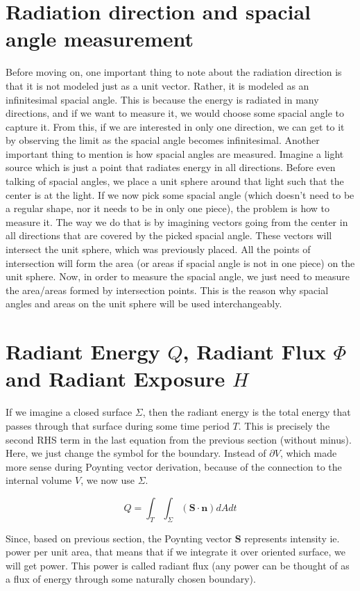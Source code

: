 \documentclass{article}
\begin{document}
\section{Radiation direction and spacial angle measurement}

Before moving on, one important thing to note about the radiation direction is that it is not modeled just as a unit vector. Rather, it is modeled as an infinitesimal spacial angle. This is because the energy is radiated in many directions, and if we want to measure it, we would choose some spacial angle to capture it. From this, if we are interested in only one direction, we can get to it by observing the limit as the spacial angle becomes infinitesimal. Another important thing to mention is how spacial angles are measured. Imagine a light source which is just a point that radiates energy in all directions. Before even talking of spacial angles, we place a unit sphere around that light such that the center is at the light. If we now pick some spacial angle (which doesn't need to be a regular shape, nor it needs to be in only one piece), the problem is how to measure it. The way we do that is by imagining vectors going from the center in all directions that are covered by the picked spacial angle. These vectors will intersect the unit sphere, which was previously placed. All the points of intersection will form the area (or areas if spacial angle is not in one piece) on the unit sphere. Now, in order to measure the spacial angle, we just need to measure the area/areas formed by intersection points. This is the reason why spacial angles and areas on the unit sphere will be used interchangeably.

\section{Radiant Energy $Q$, Radiant Flux $\Phi$ and Radiant Exposure $H$}

If we imagine a closed surface $\Sigma$, then the radiant energy is the total energy that passes through that surface during some time period $T$. This is precisely the second RHS term in the last equation from the previous section (without minus). Here, we just change the symbol for the boundary. Instead of $\partial V$, which made more sense during Poynting vector derivation, because of the connection to the internal volume $V$, we now use $\Sigma$.

\[ Q = \int_{T}\int_{\Sigma} (\mathbf{S} \cdot \mathbf{n})dAdt \]

Since, based on previous section, the Poynting vector $\mathbf{S}$ represents intensity ie. power per unit area, that means that if we integrate it over oriented surface, we will get power. This power is called radiant flux (any power can be thought of as a flux of energy through some naturally chosen boundary).
\end{document}
